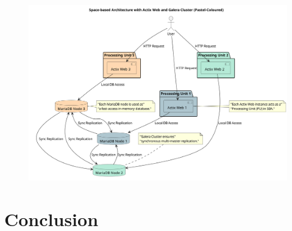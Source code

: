 \documentclass[aspectratio=169, table]{beamer}
\begin{document}
	{
		\begin{frame}[plain]
			\begin{figure}
				\centering
				\includegraphics[height=\textheight]{../../images/out/space-based_architecture.png}
		\end{figure}	
		\end{frame}
	}
	
	
	
	\section{Conclusion}
	
\end{document}
